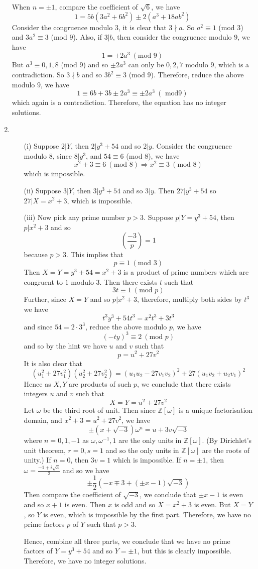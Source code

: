 \begin{enumerate}
When $n=\pm 1$, compare the coefficient of $\sqrt{6}$, we have
$$1=5b(3a^2+6b^2) \pm 2(a^3+18ab^2)$$
Consider the congruence modulo $3$, it is clear that $3 \nmid a$. So $a^2 \equiv 1$ (mod $3$) and
$3a^2 \equiv 3$ (mod $9$). Also, if $3|b$, then consider the congruence modulo $9$, we have
$$1=\pm 2a^3~(\text{mod } 9)$$
But $a^3 \equiv 0,1,8$ (mod $9$) and so $\pm 2a^3$ can only be $0,2,7$ modulo $9$, which is a contradiction.
So $3 \nmid b$ and so $3b^2 \equiv 3$ (mod $9$). Therefore, reduce the above modulo $9$, we have
$$1 \equiv 6b+3b \pm 2a^3 \equiv \pm 2a^3~(\text{ mod} 9)$$
which again is a contradiction. Therefore, the equation has no integer solutions.
\item
\begin{enumerate}
\item[(i)] Suppose $2|Y$, then $2|y^3+54$ and so $2|y$. Consider the congruence modulo $8$, since $8|y^3$,
and $54 \equiv 6$ (mod $8$), we have
    $$x^2+3 \equiv 6~(\text{mod }8) \Rightarrow x^2 \equiv 3~(\text{mod }8)$$
    which is impossible.
\item[(ii)] Suppose $3|Y$, then $3|y^3+54$ and so $3|y$. Then $27|y^3+54$ so $27|X=x^2+3$, which is impossible.
\item[(iii)] Now pick any prime number $p>3$. Suppose $p|Y=y^3+54$, then $p|x^2+3$ and so
$$\left(\frac{-3}{p}\right)=1$$
because $p>3$. This implies that
$$p \equiv 1~(\text{mod }3)$$
Then $X=Y=y^3+54=x^2+3$ is a product of prime numbers which are congruent to $1$ modulo $3$. Then there exists
$t$ such that
$$3t \equiv 1~(\text{mod } p)$$
Further, since $X=Y$ and so $p|x^2+3$, therefore, multiply both sides by $t^3$ we have
$$t^3y^3+54t^3=x^2t^3+3t^3$$
and since $54=2 \cdot 3^3$, reduce the above modulo $p$, we have
$$(-ty)^3 \equiv 2~(\text{mod }p)$$
and so by the hint we have $u$ and $v$ such that
$$p=u^2+27v^2$$
It is also clear that
$$(u^2_1+27v^2_1)(u^2_2+27v^2_2)=(u_1u_2-27v_1v_2)^2+27(u_1v_2+u_2v_1)^2$$
Hence as $X,Y$ are products of such $p$, we conclude that there exists integers $u$ and $v$ such that
$$X=Y=u^2+27v^2$$
Let $\omega$ be the third root of unit. Then since $\mathbb{Z}[\omega]$ is a unique factorisation domain, and
$x^2+3=u^2+27v^2$, we have
$$\pm(x+\sqrt{-3})\omega^n=u+3v\sqrt{-3}$$
where $n=0,1,-1$ as $\omega,\omega^{-1},1$ are the only units in $\mathbb{Z}[\omega]$.
(By Dirichlet's unit theorem, $r=0,s=1$ and so the only units in $\mathbb{Z}[\omega]$ are the roots of unity.)
If $n=0$, then $3v=1$ which is impossible. If $n=\pm 1$, then $\omega=\frac{-1+i\sqrt{3}}{2}$ and so
we have
$$\pm \frac{1}{2}\left(-x \mp 3 + (\pm x-1)\sqrt{-3}\right)$$
Then compare the coefficient of $\sqrt{-3}$, we conclude that $\pm x-1$ is even and so $x+1$ is even.
Then $x$ is odd and so $X=x^2+3$ is even. But $X=Y$, so $Y$ is even, which is impossible by the first part.
Therefore, we have no prime factors $p$ of $Y$ such that $p>3$.

Hence, combine all three parts, we conclude that we have no prime factors of $Y=y^3+54$ and so
$Y=\pm 1$, but this is clearly impossible. Therefore, we have no integer solutions.
\end{enumerate}
\end{enumerate}
